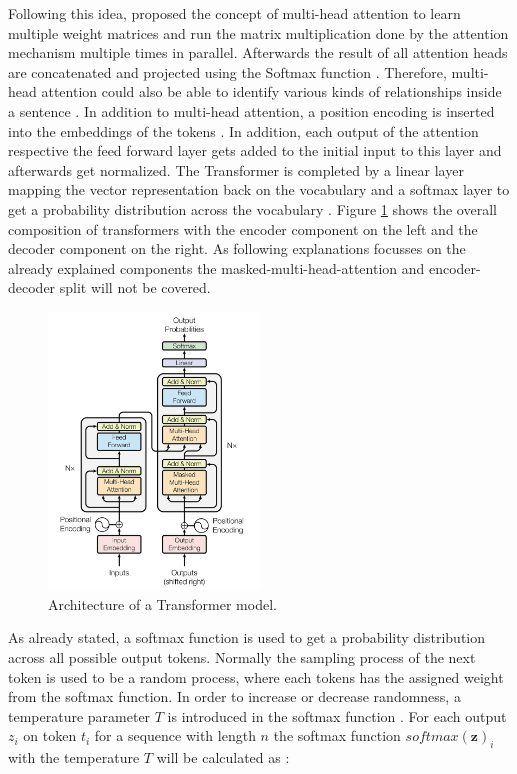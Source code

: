 \documentclass[a4paper,oneside,bibliography=totoc]{scrbook}
\begin{document}
Following this idea, \citet{Vaswani2023} proposed the concept of multi-head attention to learn multiple weight matrices and run the matrix multiplication done by the attention mechanism multiple times in parallel. Afterwards the result of all attention heads are concatenated and projected using the Softmax function \cite{Vaswani2023}. Therefore, multi-head attention could also be able to identify various kinds of relationships inside a sentence \cite{Sanderson2024}. In addition to multi-head attention, a position encoding is inserted into the embeddings of the tokens \cite{Vaswani2023}. In addition, each output of the attention respective the feed forward layer gets added to the initial input to this layer and afterwards get normalized. The Transformer is completed by a linear layer mapping the vector representation back on the vocabulary and a softmax layer to get a probability distribution across the vocabulary \cite{Vaswani2023}. Figure \ref{fig:transformer} shows the overall composition of transformers with the encoder component on the left and the decoder component on the right. As following explanations focusses on the already explained components the masked-multi-head-attention and encoder-decoder split will not be covered.

\begin{figure}[t]
  \centering
  \includegraphics[width=0.5\textwidth]{figures/Transformer.png}
  \caption{Architecture of a Transformer model. \cite{Vaswani2023}}
  \label{fig:transformer}
\end{figure}

As already stated, a softmax function is used to get a probability distribution across all possible output tokens. Normally the sampling process of the next token is used to be a random process, where each tokens has the assigned weight from the softmax function. In order to increase or decrease randomness, a temperature parameter $T$ is introduced in the softmax function \cite{Peeperkorn2024}. For each output $z_i$ on token $t_i$ for a sequence with length $n$ the softmax function $softmax(\mathbf{z})_i$ with the temperature $T$ will be calculated as \cite{Peeperkorn2024}:
\end{document}
